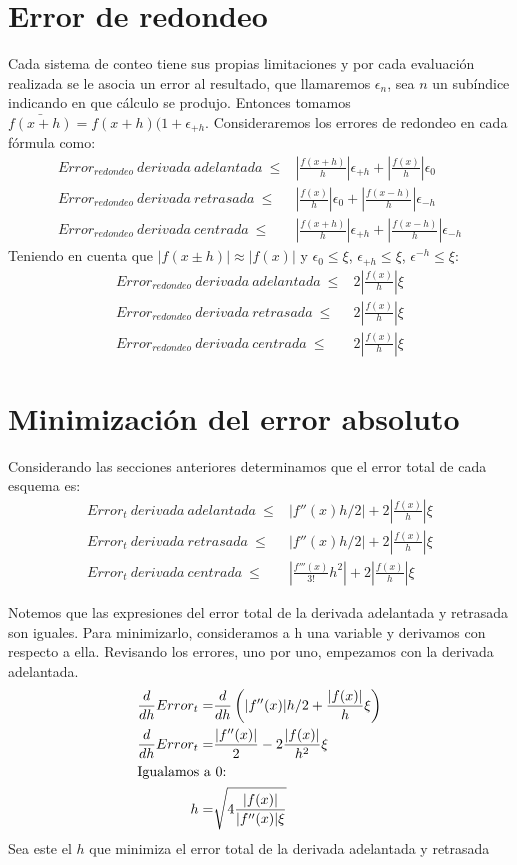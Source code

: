\documentclass[../portafolio.tex]{subfiles}
\begin{document}
\section{Error de redondeo}
Cada sistema de conteo tiene sus propias limitaciones y por cada evaluación realizada se le asocia un error al resultado, que llamaremos $\epsilon_n$, sea $n$ un subíndice indicando en que cálculo se produjo. Entonces tomamos $\bar{f(x+h)}=f(x+h)(1+\epsilon_{+h}$. Consideraremos los errores de redondeo en cada fórmula como:
\begin{align}
Error_{redondeo}{}~ derivada{}~ adelantada{}~ \leq&\left| \frac{f(x+h)}{h} \right|\epsilon_{+h} +\left| \frac{f(x)}{h} \right|\epsilon_0 \\
Error_{redondeo}{}~ derivada{}~ retrasada{}~ \leq&\left|  \frac{f(x)}{h} \right|\epsilon_0 + \left| \frac{f(x-h)}{h} \right|\epsilon_{-h} \\
Error_{redondeo}{}~ derivada{}~ centrada{}~ \leq&\left| \frac{f(x+h)}{h} \right|\epsilon_{+h} + \left| \frac{f(x-h)}{h} \right|\epsilon_{-h} 
\end{align}
Teniendo en cuenta que $|f(x \pm h)| \approx |f(x)|$ y $\epsilon_{0} \leq \xi$, $\epsilon_{+h} \leq \xi$, $\epsilon^{-h} \leq \xi$:
\begin{align}
Error_{redondeo}{}~ derivada{}~ adelantada{}~ \leq& 2\left| \frac{f(x)}{h}\right|\xi \\
Error_{redondeo}{}~ derivada{}~ retrasada{}~ \leq& 2\left|  \frac{f(x)}{h} \right|\xi\\
Error_{redondeo}{}~ derivada{}~ centrada{}~ \leq& 2\left| \frac{f(x)}{h} \right|\xi 
\end{align}
\section{Minimización del error absoluto}
Considerando las secciones anteriores determinamos que el error total de cada esquema es:
\begin{align}
Error_{t}{}~ derivada{}~ adelantada{}~ \leq& \left|f''(x)h/2 \right|+ 2 \left| \frac{f(x)}{h}\right| \xi \\
Error_{t}{}~ derivada{}~ retrasada{}~ \leq& \left|f''(x)h/2 \right| + 2 \left| \frac{f(x)}{h}\right| \xi \\
Error_{t}{}~ derivada{}~ centrada{}~ \leq& \left|\frac{f'''(x)}{3!}h^2 \right|+ 2\left| \frac{f(x)}{h} \right|\xi
\end{align}

Notemos que las expresiones del error total de la derivada adelantada y retrasada son iguales.
Para minimizarlo, consideramos a h una variable y derivamos con respecto a ella.
Revisando los errores, uno por uno, empezamos con la derivada adelantada.
\begin{align}
\frac{d}{dh} Error_{t}=&\frac{d}{dh} \left( |f''(x)|h/2 + \frac{|f(x)|}{h} \xi \right) \\
\frac{d}{dh}Error_t =& \frac{|f''(x)|}{2} - 2 \frac{|f(x)|}{h^2} \xi\\\intertext{Igualamos a 0:}
h=&\sqrt{4\frac{|f(x)|}{|f''(x)|\xi}}
\end{align}
Sea este el $h$ que minimiza el error total de la derivada adelantada y retrasada 
\end{document}
